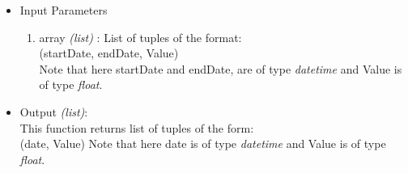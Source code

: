 \begin{itemize}
 \begin{itemize}
 \item Input Parameters
 
 \begin{enumerate}
  \item array \textit{(list)} : List of tuples of the format: \\
  (startDate, endDate, Value) \\
  Note that here startDate and endDate, are of type \textit{datetime} and Value 
is of type \textit{float}.
 \end{enumerate}

 \item Output \textit{(list)}: \\
 This function returns list of tuples of the form: \\
 (date, Value)
  Note that here date is of type \textit{datetime} and Value is of type 
\textit{float}.
 \end{itemize}
 
 
 
 
 
 
 
 
 
 
 
 
 
 
 
 
 
 
 
\end{itemize}


